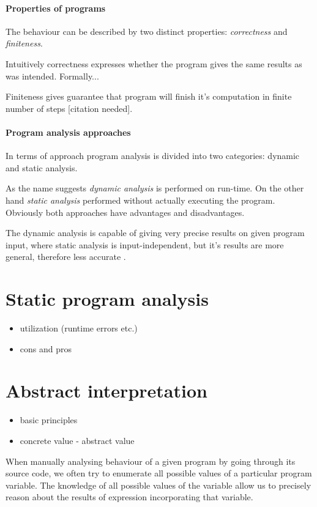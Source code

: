\documentclass[12pt,oneside]{fithesis2}
\theoremstyle{definition}
\begin{document}
\paragraph{Properties of programs}
The behaviour can be described by two distinct properties: \textit{correctness} and \textit{finiteness}.

Intuitively correctness expresses whether the program gives the same results as was intended. Formally...

Finiteness gives guarantee that program will finish it's computation in finite number of steps [citation needed].

\paragraph{Program analysis approaches}
In terms of approach program analysis is divided into two categories: dynamic and static analysis.

As the name suggests \textit{dynamic analysis} is performed on run-time. On the other hand \textit{static analysis} performed without actually executing the program. Obviously both approaches have advantages and disadvantages.

The dynamic analysis is capable of giving very precise results on given program input, where static analysis is input-independent, but it's results are more general, therefore less accurate \cite{CousotEtAl06-ASIAN}.

\section{Static program analysis}
\begin{itemize}
  \item utilization (runtime errors etc.)
  \item cons and pros
\end{itemize}

\section{Abstract interpretation}
\begin{itemize}
  \item basic principles
  \item concrete value - abstract value
\end{itemize}

When manually analysing behaviour of a given program by going through its source code, we often try to enumerate all possible values of a particular program variable. The knowledge of all possible values of the variable allow us to precisely reason about the results of expression incorporating that variable.
\end{document}
